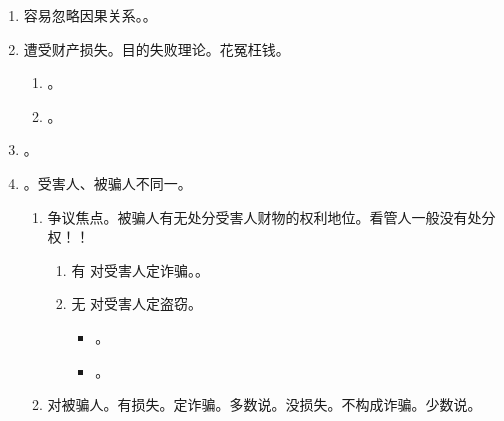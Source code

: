 \begin{enumerate}
\begin{enumerate}
\begin{enumerate}
\begin{enumerate}
                          \item {}。
                          \item 观点一。。
                          \item 观点二。。
                        \end{enumerate}
                \end{enumerate}
          \item 容易忽略因果关系。。
          \item 遭受财产损失。目的失败理论。花冤枉钱。
                \begin{enumerate}
                  \item {}。
                  \item {}。
                \end{enumerate}
          \item {}。
          \item {}。受害人、被骗人不同一。
                \begin{enumerate}
                  \item 争议焦点。被骗人有无处分受害人财物的权利地位。看管人一般没有处分权！！
                        \begin{enumerate}
                          \item 有 \yjt 对受害人定诈骗。。
                          \item 无 \yjt 对受害人定盗窃。
                                \begin{itemize}
                                  \item {}。
                                  \item {}。
                                \end{itemize}
                        \end{enumerate}
                  \item 对被骗人。\yi 有损失。定诈骗。多数说。\er 没损失。不构成诈骗。少数说。

\end{enumerate}
\end{enumerate}
\end{enumerate}
